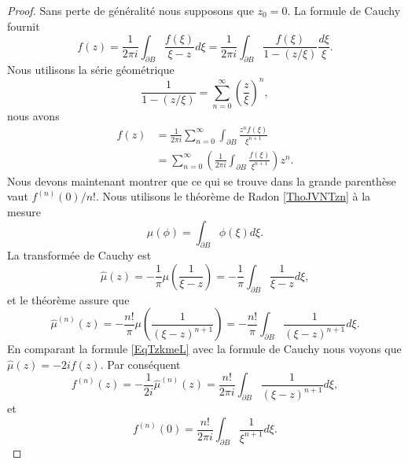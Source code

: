 \begin{proof}
    Sans perte de généralité nous supposons que \( z_0=0\). La formule de Cauchy fournit
    \begin{equation}
        f(z)=\frac{1}{ 2\pi i }\int_{\partial B}\frac{ f(\xi) }{ \xi-z }d\xi=\frac{1}{ 2\pi i }\int_{\partial B}\frac{ f(\xi) }{ 1-(z/\xi) }\frac{ d\xi }{ \xi }.
    \end{equation}
    Nous utilisons la série géométrique
    \begin{equation}
        \frac{1}{ 1-(z/\xi) }=\sum_{n=0}^{\infty}\left( \frac{ z }{ \xi } \right)^n,
    \end{equation}
    nous avons
    \begin{subequations}        \label{EqXSgZGw}
        \begin{align}
            f(z)&=\frac{1}{ 2\pi i }\sum_{n=0}^{\infty}\int_{\partial B}\frac{ z^nf(\xi) }{ \xi^{n+1} }\\
            &=\sum_{n=0}^{\infty}\left( \frac{1}{ 2\pi i }\int_{\partial B}\frac{ f(\xi) }{ \xi^{n+1} } \right)z^n.
        \end{align}
    \end{subequations}
    Nous devons maintenant montrer que ce qui se trouve dans la grande parenthèse vaut \( f^{(n)}(0)/n!\). Nous utilisons le théorème de Radon \ref{ThoJVNTzn} à la mesure
    \begin{equation}
        \mu(\phi)=\int_{\partial B}\phi(\xi)d\xi.
    \end{equation}
    La transformée de Cauchy est
    \begin{equation}        \label{EqTzkmeL}
        \hat \mu(z)=-\frac{1}{ \pi }\mu\left( \frac{1}{ \xi-z } \right)=-\frac{1}{ \pi }\int_{\partial B}\frac{1}{ \xi-z }d\xi,
    \end{equation}
    et le théorème assure que
    \begin{equation}
        \hat\mu^{(n)}(z)=-\frac{ n! }{ \pi }\mu\left( \frac{1}{ (\xi-z)^{n+1} } \right)=-\frac{ n! }{ \pi }\int_{\partial B}\frac{ 1 }{ (\xi-z)^{n+1} }d\xi.
    \end{equation}
    En comparant la formule \eqref{EqTzkmeL} avec la formule de Cauchy nous voyons que \( \hat\mu(z)=-2i f(z)\). Par conséquent
    \begin{equation}
        f^{(n)}(z)=-\frac{1}{ 2i }\hat\mu^{(n)}(z)=\frac{ n! }{ 2\pi i }\int_{\partial B}\frac{1}{ (\xi-z)^{n+1} }d\xi,
    \end{equation}
    et
    \begin{equation}
        f^{(n)}(0)=\frac{ n! }{ 2\pi i }\int_{\partial B}\frac{1}{ \xi^{n+1} }d\xi.
    \end{equation}
\end{proof}

